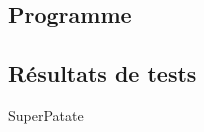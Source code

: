 \documentclass{report}
\begin{document}
  	  \subsection{Programme}
        
      \newpage
      \subsection{Résultats de tests}
        SuperPatate
\end{document}
